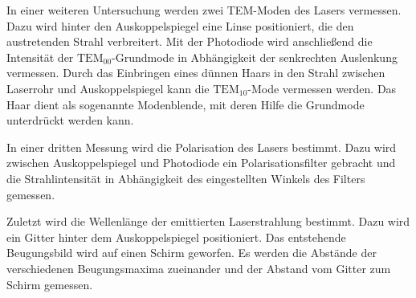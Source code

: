 In einer weiteren Untersuchung werden zwei TEM-Moden des Lasers vermessen.
Dazu wird hinter den Auskoppelspiegel eine Linse positioniert, die den
austretenden Strahl verbreitert. Mit der Photodiode wird anschließend die
Intensität der $\text{TEM}_{00}$-Grundmode in Abhängigkeit der senkrechten
Auslenkung vermessen. Durch das Einbringen eines dünnen Haars in den Strahl
zwischen Laserrohr und Auskoppelspiegel kann die $\text{TEM}_{10}$-Mode
vermessen werden. Das Haar dient als sogenannte Modenblende, mit deren Hilfe die
Grundmode unterdrückt werden kann.

In einer dritten Messung wird die Polarisation des Lasers bestimmt. Dazu wird
zwischen Auskoppelspiegel und Photodiode ein Polarisationsfilter gebracht und
die Strahlintensität in Abhängigkeit des eingestellten Winkels des Filters
gemessen.

Zuletzt wird die Wellenlänge der emittierten Laserstrahlung bestimmt. Dazu wird
ein Gitter hinter dem Auskoppelspiegel positioniert. Das entstehende
Beugungsbild wird auf einen Schirm geworfen. Es werden die Abstände der
verschiedenen Beugungsmaxima zueinander und der Abstand vom Gitter zum Schirm
gemessen.

